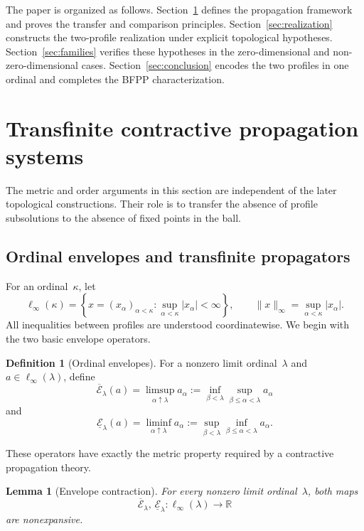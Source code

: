 \documentclass[preprint,12pt,nopreprintline]{elsarticle}
\newtheorem{lemma}[theorem]{Lemma}
\theoremstyle{definition}
\newtheorem{definition}[theorem]{Definition}
\theoremstyle{remark}
\numberwithin{equation}{section}
\begin{document}
\smallskip 

The paper is organized as follows. Section~\ref{sec:tcp} defines the propagation framework and proves
the transfer and comparison principles. Section~\ref{sec:realization} constructs the two-profile realization under explicit topological hypotheses. Section~\ref{sec:families} verifies these hypotheses in the zero-dimensional and non-zero-dimensional cases. Section~\ref{sec:conclusion} encodes the two profiles in one ordinal and completes the BFPP characterization.

\section{Transfinite contractive propagation systems}
\label{sec:tcp}

The metric and order arguments in this section are independent of the later topological constructions. Their role is to transfer the absence of profile subsolutions to the absence of fixed points in the ball.


\subsection{Ordinal envelopes and transfinite propagators}
\label{tcp:subsec:envelopes}

For an ordinal~$\kappa$, let
\[
 \ell_\infty(\kappa)=\left\{x=(x_\alpha)_{\alpha<\kappa}:\sup_{\alpha<\kappa}|x_\alpha|<\infty\right\},\qquad \|x\|_\infty=\sup_{\alpha<\kappa}|x_\alpha|.
\]
All inequalities between profiles are understood coordinatewise. We begin with the two basic envelope operators.

\begin{definition}[Ordinal envelopes]
\label{tcp:def:envelopes}
For a nonzero limit ordinal~$\lambda$ and $a\in\ell_\infty(\lambda)$, define
\[
 \overline{\mathcal E}_\lambda(a)=\limsup_{\alpha\uparrow\lambda}a_\alpha:=\inf_{\beta<\lambda}\sup_{\beta\leq\alpha<\lambda}a_\alpha
\]
and
\[
 \underline{\mathcal E}_\lambda(a)=\liminf_{\alpha\uparrow\lambda}a_\alpha:=\sup_{\beta<\lambda}\inf_{\beta\leq\alpha<\lambda}a_\alpha.
\]
\end{definition}

These operators have exactly the metric property required by a contractive propagation theory.

\begin{lemma}[Envelope contraction]
\label{tcp:lem:envelope}
For every nonzero limit ordinal~$\lambda$, both maps 
\[
\overline{\mathcal E}_\lambda,\,\underline{\mathcal E}_\lambda:\ell_\infty(\lambda)\longrightarrow\mathbb R 
\]
are nonexpansive.
\end{lemma}
\end{document}
